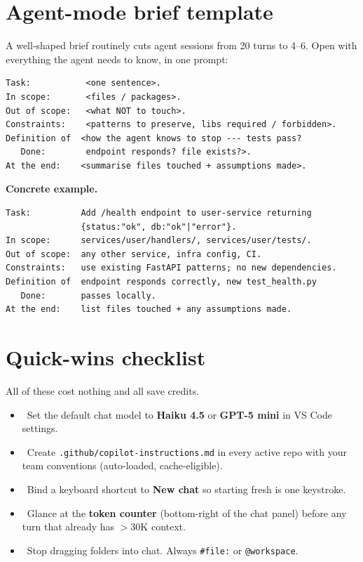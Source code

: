 \documentclass[11pt,a4paper]{article}
\newcommand{\yes}{\textcolor{successgreen}{\ding{51}}}
\begin{document}
\section{Agent-mode brief template}\label{sec:brief}

A well-shaped brief routinely cuts agent sessions from 20 turns to 4--6. Open with everything the agent needs to know, in one prompt:

\begin{lstlisting}
Task:           <one sentence>.
In scope:       <files / packages>.
Out of scope:   <what NOT to touch>.
Constraints:    <patterns to preserve, libs required / forbidden>.
Definition of  <how the agent knows to stop --- tests pass?
   Done:        endpoint responds? file exists?>.
At the end:    <summarise files touched + assumptions made>.
\end{lstlisting}

\smallskip
\noindent\textbf{Concrete example.}
\par\nobreak\smallskip

\begin{lstlisting}
Task:          Add /health endpoint to user-service returning
               {status:"ok", db:"ok"|"error"}.
In scope:      services/user/handlers/, services/user/tests/.
Out of scope:  any other service, infra config, CI.
Constraints:   use existing FastAPI patterns; no new dependencies.
Definition of  endpoint responds correctly, new test_health.py
   Done:       passes locally.
At the end:    list files touched + any assumptions made.
\end{lstlisting}

\section{Quick-wins checklist}\label{sec:quickwins}

All of these cost nothing and all save credits.

\begin{itemize}
  \item \yes~Set the default chat model to \textbf{Haiku 4.5} or \textbf{GPT-5 mini} in VS Code settings.
  \item \yes~Create \texttt{.github/copilot-instructions.md} in every active repo with your team conventions (auto-loaded, cache-eligible).
  \item \yes~Bind a keyboard shortcut to \textbf{New chat} so starting fresh is one keystroke.
  \item \yes~Glance at the \textbf{token counter} (bottom-right of the chat panel) before any turn that already has $>$30K context.
  \item \yes~Stop dragging folders into chat. Always \texttt{\#file:} or \texttt{@workspace}.
\end{itemize}
\end{document}
